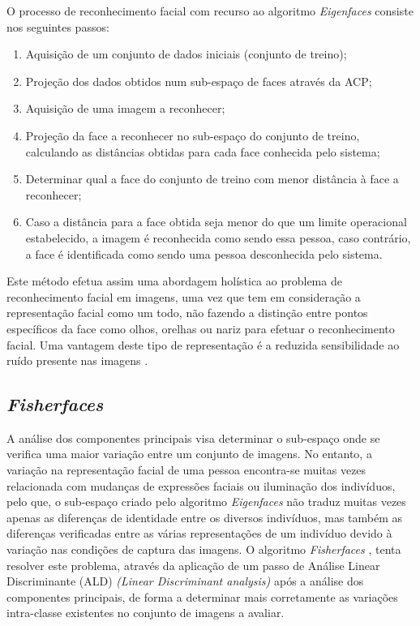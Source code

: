 O processo de reconhecimento facial com recurso ao algoritmo \textit{Eigenfaces} consiste nos seguintes passos:
\begin{enumerate}
\item Aquisição de um conjunto de dados iniciais (conjunto de treino);
\item Projeção dos dados obtidos num sub-espaço de faces através da ACP;
\item Aquisição de uma imagem a reconhecer;
\item Projeção da face a reconhecer no sub-espaço do conjunto de treino, calculando as distâncias obtidas para cada face conhecida pelo sistema;
\item Determinar qual a face do conjunto de treino com menor distância à face a reconhecer;
\item Caso a distância para a face obtida seja menor do que um limite operacional estabelecido, a imagem é reconhecida como sendo essa pessoa, caso contrário, a face é identificada como sendo uma pessoa desconhecida pelo sistema.
\end{enumerate}

Este método efetua assim uma abordagem holística ao problema de reconhecimento facial em imagens, uma vez que tem em consideração a representação facial como um todo, não fazendo a distinção entre pontos específicos da face como olhos, orelhas ou nariz para efetuar o reconhecimento facial. Uma vantagem deste tipo de representação é a reduzida sensibilidade ao ruído presente nas imagens \cite{Zhao2003}.

\subsection{\textit{Fisherfaces}}
A análise dos componentes principais visa determinar o sub-espaço onde se verifica uma maior variação entre um conjunto de imagens. No entanto, a variação na representação facial de uma pessoa encontra-se muitas vezes relacionada com mudanças de expressões faciais ou iluminação dos indivíduos, pelo que, o sub-espaço criado pelo algoritmo \textit{Eigenfaces} não traduz muitas vezes apenas as diferenças de identidade entre os diversos indivíduos, mas também as diferenças verificadas entre as várias representações de um indivíduo devido à variação nas condições de captura das imagens. O algoritmo \textit{Fisherfaces} \cite{Belhumeur1997, Etemad1997, Zhao1998}, tenta resolver este problema, através da aplicação de um passo de Análise Linear Discriminante (ALD) \textit{(Linear Discriminant analysis)} após a análise dos componentes principais, de forma a determinar mais corretamente as variações intra-classe existentes no conjunto de imagens a avaliar.

